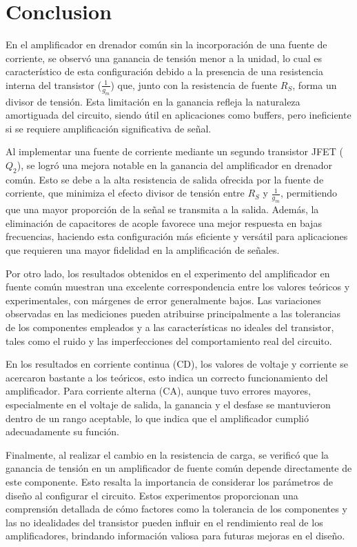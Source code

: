 \documentclass[journal]{IEEEtran}
\begin{document}
\section{Conclusion}
\par En el amplificador en drenador común sin la incorporación de una fuente de corriente, se observó una ganancia de tensión menor a la unidad, lo cual es característico de esta configuración debido a la presencia de una resistencia interna del transistor ($\frac{1}{g_m}$) que, junto con la resistencia de fuente $R_S$, forma un divisor de tensión. Esta limitación en la ganancia refleja la naturaleza amortiguada del circuito, siendo útil en aplicaciones como buffers, pero ineficiente si se requiere amplificación significativa de señal.
\par Al implementar una fuente de corriente mediante un segundo transistor JFET ($Q_2$), se logró una mejora notable en la ganancia del amplificador en drenador común. Esto se debe a la alta resistencia de salida ofrecida por la fuente de corriente, que minimiza el efecto divisor de tensión entre $R_S$ y $\frac{1}{g_m}$, permitiendo que una mayor proporción de la señal se transmita a la salida. Además, la eliminación de capacitores de acople favorece una mejor respuesta en bajas frecuencias, haciendo esta configuración más eficiente y versátil para aplicaciones que requieren una mayor fidelidad en la amplificación de señales.

\par Por otro lado, los resultados obtenidos en el experimento del amplificador en fuente común muestran una excelente correspondencia entre los valores teóricos y experimentales, con márgenes de error generalmente bajos. Las variaciones observadas en las mediciones pueden atribuirse principalmente a las tolerancias de los componentes empleados y a las características no ideales del transistor, tales como el ruido y las imperfecciones del comportamiento real del circuito.

\par En los resultados en corriente continua (CD), los valores de voltaje y corriente se acercaron bastante a los teóricos, esto indica un correcto funcionamiento del amplificador. Para corriente alterna (CA), aunque tuvo errores mayores, especialmente en el voltaje de salida, la ganancia y el desfase se mantuvieron dentro de un rango aceptable, lo que indica que el amplificador cumplió adecuadamente su función.

\par Finalmente, al realizar el cambio en la resistencia de carga, se verificó que la ganancia de tensión en un amplificador de fuente común depende directamente de este componente. Esto resalta la importancia de considerar los parámetros de diseño al configurar el circuito. Estos experimentos proporcionan una comprensión detallada de cómo factores como la tolerancia de los componentes y las no idealidades del transistor pueden influir en el rendimiento real de los amplificadores, brindando información valiosa para futuras mejoras en el diseño.
\end{document}
